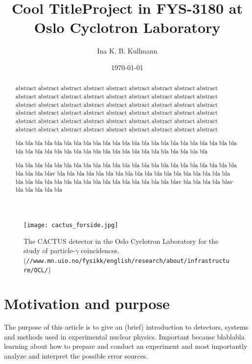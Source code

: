 \documentclass[11pt,a4wide]{article}
\title{{\Huge {\bf Cool Title}}\linebreak \linebreak \small{Project in FYS-3180 at} \linebreak \Large{ Oslo Cyclotron Laboratory}  }
\author{Ina K. B. Kullmann}
\date{\today}
\begin{document}
\maketitle

\begin{abstract}
abstract abstract abstract abstract abstract abstract abstract abstract abstract abstract abstract abstract abstract abstract abstract abstract abstract abstract abstract abstract abstract abstract abstract abstract abstract abstract abstract abstract abstract abstract abstract abstract abstract abstract abstract abstract abstract abstract abstract abstract abstract abstract abstract abstract abstract abstract abstract abstract abstract abstract abstract abstract abstract abstract 

bla bla bla bla bla bla bla bla bla bla bla bla bla bla bla bla bla bla bla bla bla bla bla bla bla bla bla bla bla bla bla bla bla bla bla bla bla bla bla bla bla bla bla 

bla bla bla bla bla bla bla bla bla bla bla bla bla bla bla bla bla bla bla bla bla bla bla bla bla bla blav bla bla bla bla bla bla bla bla bla bla bla bla bla bla bla bla bla bla bla bla bla bla bla bla bla bla bla bla bla bla bla bla bla bla blav bla bla bla bla blav bla bla bla bla bla
\end{abstract}

\begin{figure}[htp]
\centering
\texttt{[image: cactus\_forside.jpg]}
\caption{The CACTUS detector in the Oslo Cyclotron Laboratory for the study of particle-$\gamma$ coincidences. (\texttt{//www.mn.uio.no/fysikk/english/research/about/infrastructure/OCL/}) }
\label{fig:front_page}
\end{figure}

\newpage

\tableofcontents
\newpage

\section{Motivation and purpose}

The purpose of this article is to give an (brief) introduction to detectors, systems and methods used in experimental nuclear physics. Important because blablabla learning about how to prepare and conduct an experiment and most importantly analyze and interpret the possible error sources.
\end{document}
